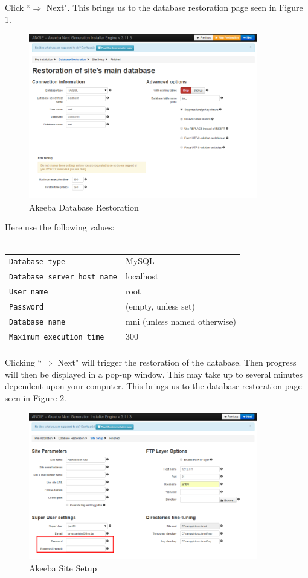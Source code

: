 \documentclass[]{report}
\begin{document}
\noindent
Click ``$\Rightarrow$ Next". This brings us to the database restoration page seen in Figure \ref{fig:akeebadatabaserestoration}.

\newpage

\begin{figure}[h] 
	\centering
	\includegraphics[width=10cm]{akeeba2.png}
	\caption{Akeeba Database Restoration}
	\label{fig:akeebadatabaserestoration}
\end{figure}

\noindent
Here use the following values:\\
\\
\begin{tabular}{l l}
	\texttt{Database type} & MySQL\\
	\texttt{Database server host name} & localhost\\
	\texttt{User name} & root\\
	\texttt{Password} & (empty, unless set)\\
	\texttt{Database name} & mni (unless named otherwise)\\
	\texttt{Maximum execution time} & 300\\\\
\end{tabular}

\noindent
Clicking ``$\Rightarrow$ Next" will trigger the restoration of the database. Then progress will then be displayed in a pop-up window. This may take up to several minutes dependent upon your computer. This brings us to the database restoration page seen in Figure \ref{fig:akeebasitesetup}.

\newpage

\begin{figure}[h] 
	\centering
	\includegraphics[width=10cm]{akeeba3.png}
	\caption{Akeeba Site Setup}
	\label{fig:akeebasitesetup}
\end{figure}
\end{document}
